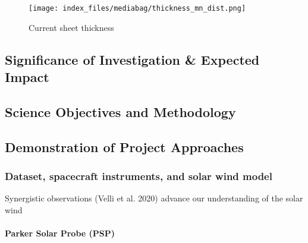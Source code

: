 \documentclass[
  letterpaper,
  DIV=11,
  numbers=noendperiod,
  oneside]{scrartcl}
\let\oldparagraph\paragraph
\renewcommand{\paragraph}[1]{\oldparagraph{#1}\mbox{}}
\begin{document}
\begin{figure}[H]

{\centering \texttt{[image: index\_files/mediabag/thickness\_mn\_dist.png]}

}

\caption{Current sheet thickness}

\end{figure}%

\newpage{}

\subsection{Significance of Investigation \& Expected
Impact}\label{significance-of-investigation-expected-impact}

\subsection{Science Objectives and
Methodology}\label{science-objectives-and-methodology}

\subsection{Demonstration of Project
Approaches}\label{demonstration-of-project-approaches}

\subsubsection{Dataset, spacecraft instruments, and solar wind
model}\label{dataset-spacecraft-instruments-and-solar-wind-model}

Synergistic observations (Velli et al. 2020) advance our understanding
of the solar wind

\paragraph{Parker Solar Probe (PSP)}
\end{document}
